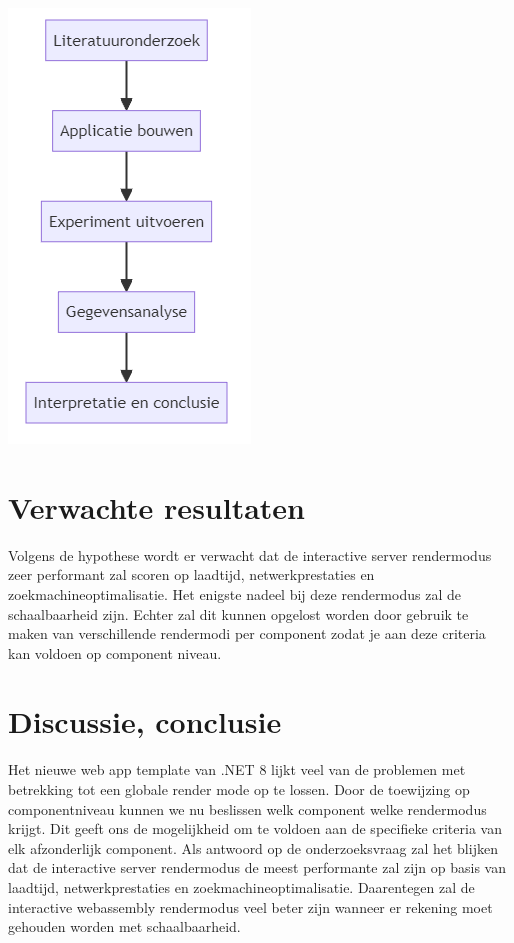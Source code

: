 \documentclass{hogent-article}
\begin{document}
\includegraphics{img/diagram_methodologie.png}

\section{Verwachte resultaten}%
\label{sec:verwachte-resultaten}

Volgens de hypothese wordt er verwacht dat de interactive server rendermodus zeer performant zal scoren op laadtijd, netwerkprestaties en zoekmachineoptimalisatie. Het enigste nadeel bij deze rendermodus
zal de schaalbaarheid zijn. Echter zal dit kunnen opgelost worden door gebruik te maken van verschillende rendermodi per component zodat je aan deze criteria kan voldoen op component niveau.


\section{Discussie, conclusie}%
\label{sec:discussie-conclusie}
Het nieuwe web app template van .NET 8 lijkt veel van de problemen met betrekking tot een globale render mode op te lossen. 
Door de toewijzing op componentniveau kunnen we nu beslissen welk component welke rendermodus krijgt. 
Dit geeft ons de mogelijkheid om te voldoen aan de specifieke criteria van elk afzonderlijk component. Als antwoord op de onderzoeksvraag zal het blijken dat de interactive server rendermodus de meest performante
zal zijn op basis van laadtijd, netwerkprestaties en zoekmachineoptimalisatie. Daarentegen zal de interactive webassembly rendermodus veel beter zijn wanneer er rekening moet gehouden worden met schaalbaarheid.
\end{document}
